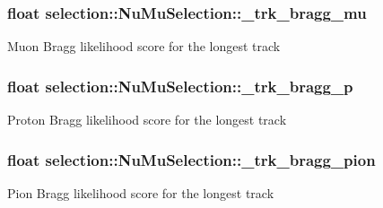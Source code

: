 \subsubsection[{\texorpdfstring{\+\_\+trk\+\_\+bragg\+\_\+mu}{_trk_bragg_mu}}]{\setlength{\rightskip}{0pt plus 5cm}float selection\+::\+Nu\+Mu\+Selection\+::\+\_\+trk\+\_\+bragg\+\_\+mu\hspace{0.3cm}{\ttfamily [private]}}\hypertarget{classselection_1_1NuMuSelection_a51cf3e575038967284eb7ff10eeba9e0}{}\label{classselection_1_1NuMuSelection_a51cf3e575038967284eb7ff10eeba9e0}
Muon Bragg likelihood score for the longest track 
\subsubsection[{\texorpdfstring{\+\_\+trk\+\_\+bragg\+\_\+p}{_trk_bragg_p}}]{\setlength{\rightskip}{0pt plus 5cm}float selection\+::\+Nu\+Mu\+Selection\+::\+\_\+trk\+\_\+bragg\+\_\+p\hspace{0.3cm}{\ttfamily [private]}}\hypertarget{classselection_1_1NuMuSelection_a14e0373dc5bdb3b21399f45b7313294c}{}\label{classselection_1_1NuMuSelection_a14e0373dc5bdb3b21399f45b7313294c}
Proton Bragg likelihood score for the longest track 
\subsubsection[{\texorpdfstring{\+\_\+trk\+\_\+bragg\+\_\+pion}{_trk_bragg_pion}}]{\setlength{\rightskip}{0pt plus 5cm}float selection\+::\+Nu\+Mu\+Selection\+::\+\_\+trk\+\_\+bragg\+\_\+pion\hspace{0.3cm}{\ttfamily [private]}}\hypertarget{classselection_1_1NuMuSelection_ae68f8cd5aba5ad848ac6ef0576ce6039}{}\label{classselection_1_1NuMuSelection_ae68f8cd5aba5ad848ac6ef0576ce6039}
Pion Bragg likelihood score for the longest track 
